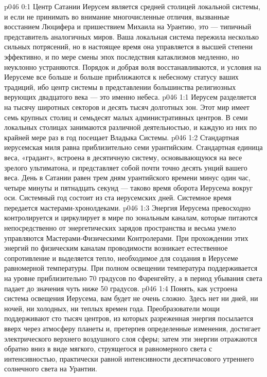 \author{Архангел}
\vs p046 0:1 Центр Сатании Иерусем является средней столицей локальной системы, и если не принимать во внимание многочисленные отличия, вызванные восстанием Люцифера и пришествием Михаила на Урантию, это --- типичный представитель аналогичных миров. Ваша локальная система пережила несколько сильных потрясений, но в настоящее время она управляется в высшей степени эффективно, и по мере смены эпох последствия катаклизмов медленно, но неуклонно устраняются. Порядок и добрая воля восстанавливаются, и условия на Иерусеме все больше и больше приближаются к небесному статусу ваших традиций, ибо центр системы в представлении большинства религиозных верующих двадцатого века --- это именно небеса.
\vs p046 1:1 Иерусем разделяется на тысячу широтных секторов и десять тысяч долготных зон. Этот мир имеет семь крупных столиц и семьдесят малых административных центров. В семи локальных столицах занимаются различной деятельностью, и каждую из них по крайней мере раз в год посещает Владыка Системы.
\vs p046 1:2 \pc Стандартная иерусемская миля равна приблизительно семи урантийским. Стандартная единица веса, «градант», встроена в десятичную систему, основывающуюся на весе зрелого ультиматона, и представляет собой почти точно десять унций вашего веса. День в Сатании равен трем дням урантийского времени минус один час, четыре минуты и пятнадцать секунд --- таково время оборота Иерусема вокруг оси. Системный год состоит из ста иерусемских дней. Системное время передается мастерами\hyp{}хронолдеками.
\vs p046 1:3 \pc Энергия Иерусема превосходно контролируется и циркулирует в мире по зональным каналам, которые питаются непосредственно от энергетических зарядов пространства и весьма умело управляются Мастерами\hyp{}Физическими Контролерами. При прохождении этих энергий по физическим каналам проводимости возникает естественное сопротивление и выделяется тепло, необходимое для создания в Иерусеме равномерной температуры. При полном освещении температура поддерживается на уровне приблизительно 70 градусов по Фаренгейту, а в период убывания света падает до значения чуть ниже 50 градусов.
\vs p046 1:4 \pc Понять, как устроена система освещения Иерусема, вам будет не очень сложно. Здесь нет ни дней, ни ночей, ни холодных, ни теплых времен года. Преобразователи мощи поддерживают сто тысяч центров, из которых разреженная энергия посылается вверх через атмосферу планеты и, претерпев определенные изменения, достигает электрического верхнего воздушного слоя сферы; затем эти энергии отражаются обратно вниз в виде мягкого, струящегося и равномерного света с интенсивностью, практически равной интенсивности десятичасового утреннего солнечного света на Урантии.
